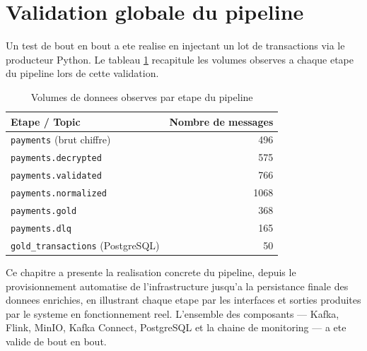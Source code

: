 \section{Validation globale du pipeline}
\label{sec:validation}

Un test de bout en bout a ete realise en injectant un lot de transactions via le
producteur Python. Le tableau \ref{tab:volumes} recapitule les volumes observes a
chaque etape du pipeline lors de cette validation.

\begin{table}[H]
\centering
\renewcommand{\arraystretch}{1.4}
\begin{tabular}{|l|r|}
\hline
\textbf{Etape / Topic} & \textbf{Nombre de messages} \\
\hline
\texttt{payments} (brut chiffre) & 496 \\
\texttt{payments.decrypted} & 575 \\
\texttt{payments.validated} & 766 \\
\texttt{payments.normalized} & 1068 \\
\texttt{payments.gold} & 368 \\
\texttt{payments.dlq} & 165 \\
\texttt{gold\_transactions} (PostgreSQL) & 50 \\
\hline
\end{tabular}
\caption{Volumes de donnees observes par etape du pipeline}
\label{tab:volumes}
\end{table}

\conclusionchapitre

Ce chapitre a presente la realisation concrete du pipeline, depuis le provisionnement
automatise de l'infrastructure jusqu'a la persistance finale des donnees enrichies,
en illustrant chaque etape par les interfaces et sorties produites par le systeme en
fonctionnement reel. L'ensemble des composants --- Kafka, Flink, MinIO, Kafka Connect,
PostgreSQL et la chaine de monitoring --- a ete valide de bout en bout.
